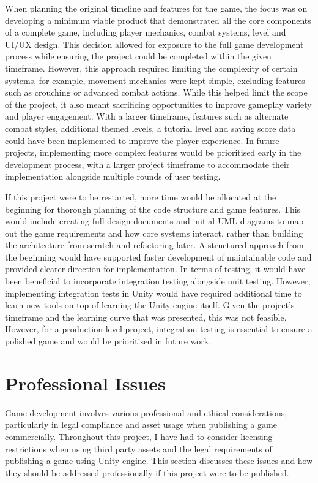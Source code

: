 \documentclass[10pt]{final_report}
\begin{document}
When planning the original timeline and features for the game, the focus was on developing a minimum viable product that demonstrated all the core components of a complete game, including player mechanics, combat systems, level and UI/UX design. This decision allowed for exposure to the full game development process while ensuring the project could be completed within the given timeframe. However, this approach required limiting the complexity of certain systems, for example, movement mechanics were kept simple, excluding features such as crouching or advanced combat actions. While this helped limit the scope of the project, it also meant sacrificing opportunities to improve gameplay variety and player engagement. With a larger timeframe, features such as alternate combat styles, additional themed levels, a tutorial level and saving score data could have been implemented to improve the player experience. In future projects, implementing more complex features would be prioritised early in the development process, with a larger project timeframe to accommodate their implementation alongside multiple rounds of user testing. \newline

If this project were to be restarted, more time would be allocated at the beginning for thorough planning of the code structure and game features. This would include creating full design documents and initial UML diagrams to map out the game requirements and how core systems interact, rather than building the architecture from scratch and refactoring later. A structured approach from the beginning would have supported faster development of maintainable code and provided clearer direction for implementation.\newline
In terms of testing, it would have been beneficial to incorporate integration testing alongside unit testing. However, implementing integration tests in Unity would have required additional time to learn new tools on top of learning the Unity engine itself. Given the project's timeframe and the learning curve that was presented, this was not feasible. However, for a production level project, integration testing is essential to ensure a polished game and would be prioritised in future work.

\chapter{Professional Issues}
Game development involves various professional and ethical considerations, particularly in legal compliance and asset usage when publishing a game commercially. Throughout this project, I have had to consider licensing restrictions when using third party assets and the legal requirements of publishing a game using Unity engine. This section discusses these issues and how they should be addressed professionally if this project were to be published. \newline
\end{document}

